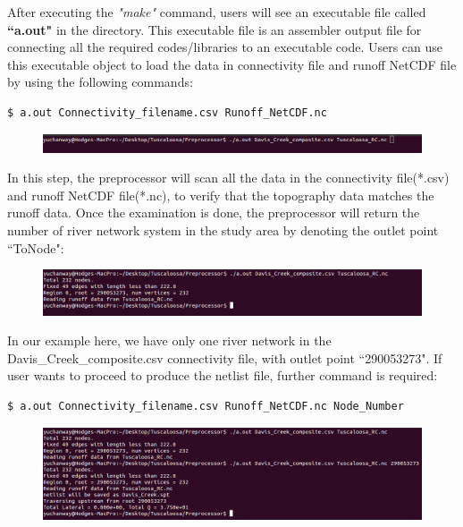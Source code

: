 \documentclass[12pt, letterpaper]{article}
\begin{document}
\begin{appendices}
\begin{flushleft}
After executing the \emph{"make"} command, users will see an executable file called \textbf{``a.out"} in the directory. This executable file is an assembler output file for connecting all the required codes/libraries to an executable code. Users can use this executable object to load the data in connectivity file and runoff NetCDF file by using the following commands:
\newline
\begin{lstlisting}[frame=single]
$ a.out Connectivity_filename.csv Runoff_NetCDF.nc
\end{lstlisting}
\begin{figure}[H]
	\centering
	\includegraphics[width = 1.0\textwidth]{figure/aout_1.png} %
	\label{fig:process}%
\end{figure}
In this step, the preprocessor will scan all the data in the connectivity file(*.csv) and runoff NetCDF file(*.nc), to verify that the topography data matches the runoff data. Once the examination is done, the preprocessor will return the number of river network system in the study area by denoting the outlet point ``ToNode":

\begin{figure}[H]
	\centering
	\includegraphics[width = 1.0\textwidth]{figure/aout_2.png} %
	\label{fig:process}%
\end{figure}

In our example here, we have only one river network in the Davis\_Creek\_composite.csv connectivity file, with outlet point ``290053273". If user wants to proceed to produce the netlist file, further command is required:

\begin{lstlisting}[frame=single,basicstyle=\small]
$ a.out Connectivity_filename.csv Runoff_NetCDF.nc Node_Number
\end{lstlisting}


\begin{figure}[H]
	\centering
	\includegraphics[width = 1.0\textwidth]{figure/aout_4.png} %
	\label{fig:process}%
\end{figure}



\end{flushleft}
\end{appendices}
\end{document}
